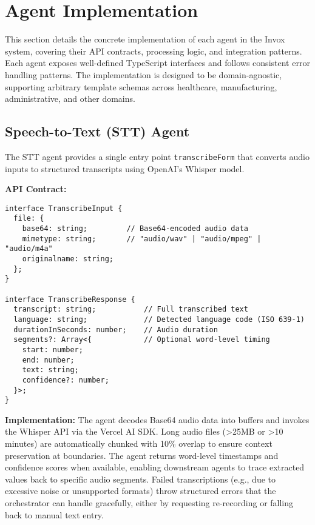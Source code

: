 \section{Agent Implementation}
\label{sec:impl-agents}

This section details the concrete implementation of each agent in the Invox system, covering their API contracts, processing logic, and integration patterns. Each agent exposes well-defined TypeScript interfaces and follows consistent error handling patterns. The implementation is designed to be domain-agnostic, supporting arbitrary template schemas across healthcare, manufacturing, administrative, and other domains.

\subsection{Speech-to-Text (STT) Agent}
\label{subsec:impl-stt}

The STT agent provides a single entry point \texttt{transcribeForm} that converts audio inputs to structured transcripts using OpenAI's Whisper model.

\textbf{API Contract:}
\begin{verbatim}
interface TranscribeInput {
  file: {
    base64: string;         // Base64-encoded audio data
    mimetype: string;       // "audio/wav" | "audio/mpeg" | "audio/m4a"
    originalname: string;
  };
}

interface TranscribeResponse {
  transcript: string;           // Full transcribed text
  language: string;             // Detected language code (ISO 639-1)
  durationInSeconds: number;    // Audio duration
  segments?: Array<{            // Optional word-level timing
    start: number;
    end: number;
    text: string;
    confidence?: number;
  }>;
}
\end{verbatim}

\textbf{Implementation:} The agent decodes Base64 audio data into buffers and invokes the Whisper API via the Vercel AI SDK. Long audio files (>25MB or >10 minutes) are automatically chunked with 10\% overlap to ensure context preservation at boundaries. The agent returns word-level timestamps and confidence scores when available, enabling downstream agents to trace extracted values back to specific audio segments. Failed transcriptions (e.g., due to excessive noise or unsupported formats) throw structured errors that the orchestrator can handle gracefully, either by requesting re-recording or falling back to manual text entry.

